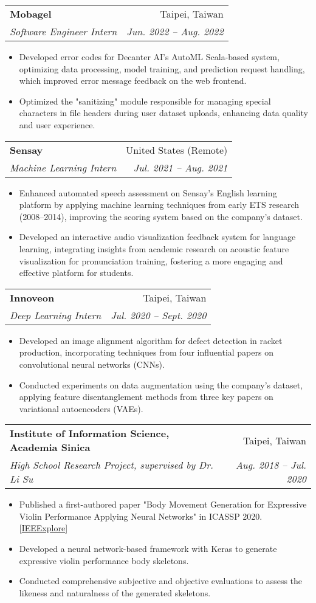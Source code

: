 \documentclass[letterpaper,11pt]{article}
\makeatletter
\newcommand{\resumeItem}[1]{
  \item\small{#1}
}
\newcommand{\resumeSubheading}[4]{
  \vspace{-1pt}\item
    \begin{tabular*}{0.97\textwidth}[t]{l@{\extracolsep{\fill}}r}
      \textbf{#1} & #2 \\
      \textit{\small#3} & \textit{\small #4} \\
    \end{tabular*}\vspace{-5pt}
}
\newcommand{\resumeItemListStart}{\begin{itemize}}
\newcommand{\resumeItemListEnd}{\end{itemize}\vspace{-5pt}}
\makeatother
\begin{document}
    \resumeSubheading
      {Mobagel}{Taipei, Taiwan}
      {Software Engineer Intern}{Jun. 2022 -- Aug. 2022}
      \resumeItemListStart
        \resumeItem{}{Developed error codes for Decanter AI's AutoML Scala-based system, optimizing data processing, model training, and prediction request handling, which improved error message feedback on the web frontend.}
        \resumeItem{}{Optimized the "sanitizing" module responsible for managing special characters in file headers during user dataset uploads, enhancing data quality and user experience.}
      \resumeItemListEnd

    \resumeSubheading
      {Sensay}{United States (Remote)}
      {Machine Learning Intern}{Jul. 2021 -- Aug. 2021}
      \resumeItemListStart
        \resumeItem{}{Enhanced automated speech assessment on Sensay's English learning platform by applying machine learning techniques from early ETS research (2008–2014), improving the scoring system based on the company’s dataset.}
        \resumeItem{}{Developed an interactive audio visualization feedback system for language learning, integrating insights from academic research on acoustic feature visualization for pronunciation training, fostering a more engaging and effective platform for students.}
      \resumeItemListEnd
    
      \resumeSubheading
        {Innoveon}{Taipei, Taiwan}
        {Deep Learning Intern}{Jul. 2020 -- Sept. 2020}
        \resumeItemListStart
          \resumeItem{}{Developed an image alignment algorithm for defect detection in racket production, incorporating techniques from four influential papers on convolutional neural networks (CNNs).}
          \resumeItem{}{Conducted experiments on data augmentation using the company’s dataset, applying feature disentanglement methods from three key papers on variational autoencoders (VAEs).}
        \resumeItemListEnd
      
        \resumeSubheading
          {Institute of Information Science, Academia Sinica}{Taipei, Taiwan}
          {High School Research Project, supervised by Dr. Li Su} {Aug. 2018 -- Jul. 2020}
          \resumeItemListStart
            \resumeItem{}{Published a first-authored paper "Body Movement Generation for Expressive Violin Performance Applying Neural Networks" in ICASSP 2020. [\href{https://ieeexplore.ieee.org/document/9054463}{IEEExplore}]}
            \resumeItem{}{Developed a neural network-based framework with Keras to generate expressive violin performance body skeletons.}
            \resumeItem{}{Conducted comprehensive subjective and objective evaluations to assess the likeness and naturalness of the generated skeletons.}
          \resumeItemListEnd
          
\end{document}
